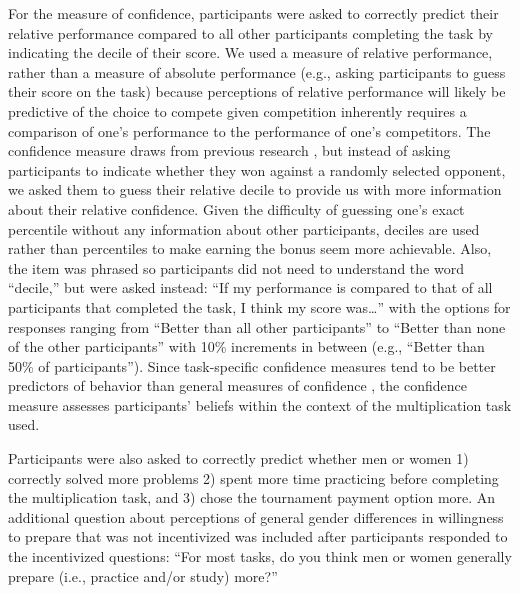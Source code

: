 \documentclass[letterpaper, nobind]{templates/ociamthesis}
\begin{document}
For the measure of confidence, participants were asked to correctly predict their relative performance compared to all other participants completing the task by indicating the decile of their score. We used a measure of relative performance, rather than a measure of absolute performance (e.g., asking participants to guess their score on the task) because perceptions of relative performance will likely be predictive of the choice to compete given competition inherently requires a comparison of one's performance to the performance of one's competitors. The confidence measure draws from previous research \autocite{Niederle2007}, but instead of asking participants to indicate whether they won against a randomly selected opponent, we asked them to guess their relative decile to provide us with more information about their relative confidence. Given the difficulty of guessing one's exact percentile without any information about other participants, deciles are used rather than percentiles to make earning the bonus seem more achievable. Also, the item was phrased so participants did not need to understand the word ``decile,'' but were asked instead: ``If my performance is compared to that of all participants that completed the task, I think my score was\ldots{}'' with the options for responses ranging from ``Better than all other participants'' to ``Better than none of the other participants'' with 10\% increments in between (e.g., ``Better than 50\% of participants''). Since task-specific confidence measures tend to be better predictors of behavior than general measures of confidence \autocite[see][ for review]{Oney2015}, the confidence measure assesses participants' beliefs within the context of the multiplication task used.

Participants were also asked to correctly predict whether men or women 1) correctly solved more problems 2) spent more time practicing before completing the multiplication task, and 3) chose the tournament payment option more. An additional question about perceptions of general gender differences in willingness to prepare that was not incentivized was included after participants responded to the incentivized questions: ``For most tasks, do you think men or women generally prepare (i.e., practice and/or study) more?''
\end{document}
